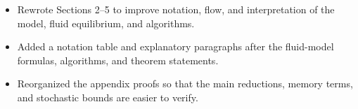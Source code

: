 \changes
\begin{itemize}
    \item Rewrote Sections 2--5 to improve notation, flow, and interpretation of the model, fluid equilibrium, and algorithms.
    \item Added a notation table and explanatory paragraphs after the fluid-model formulas, algorithms, and theorem statements.
    \item Reorganized the appendix proofs so that the main reductions, memory terms, and stochastic bounds are easier to verify.
\end{itemize}
